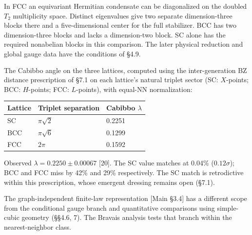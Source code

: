 \documentclass[
]{article}
\begin{document}
In FCC an equivariant Hermitian condensate can be diagonalized on the
doubled \(T_2\) multiplicity space. Distinct eigenvalues give two
separate dimension-three blocks there and a five-dimensional center for
the full stabilizer. BCC has two dimension-three blocks and lacks a
dimension-two block. SC alone has the required nonabelian blocks in this
comparison. The later physical reduction and global gauge data have the
conditions of §4.9.

The Cabibbo angle on the three lattices, computed using the
inter-generation BZ distance prescription of §7.1 on each lattice's
natural triplet sector (SC: \(X\)-points; BCC: \(H\)-points; FCC:
\(L\)-points), with equal-NN normalization:

\begin{longtable}[]{@{}lll@{}}
\toprule\noalign{}
Lattice & Triplet separation & Cabibbo \(\lambda\) \\
\midrule\noalign{}
\endhead
\bottomrule\noalign{}
\endlastfoot
SC & \(\pi\sqrt{2}\) & 0.2251 \\
BCC & \(\pi\sqrt{6}\) & 0.1299 \\
FCC & \(2\pi\) & 0.1592 \\
\end{longtable}

Observed \(\lambda = 0.2250 \pm 0.00067\) {[}20{]}. The SC value matches
at 0.04\% (\(0.12\sigma\)); BCC and FCC miss by 42\% and 29\%
respectively. The SC match is retrodictive within this prescription,
whose emergent dressing remains open (§7.1).

The graph-independent finite-law representation {[}Main §3.4{]} has a
different scope from the conditional gauge branch and quantitative
comparisons using simple-cubic geometry (§§4.6, 7). The Bravais analysis
tests that branch within the nearest-neighbor class.
\end{document}
